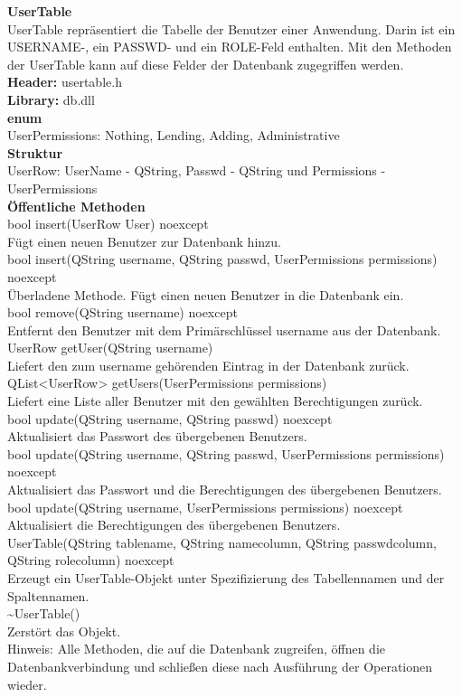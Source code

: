 \textbf{UserTable}\\
UserTable repräsentiert die Tabelle der Benutzer einer Anwendung. Darin ist ein USERNAME-, ein PASSWD- und ein ROLE-Feld enthalten. Mit den Methoden der UserTable kann auf diese Felder der Datenbank zugegriffen werden. \bigskip \\
\textbf{Header:} usertable.h\bigskip \\
\textbf{Library:} db.dll\bigskip \\
\textbf{enum}\\
UserPermissions: Nothing, Lending, Adding, Administrative\bigskip \\
\textbf{Struktur}\\
UserRow: UserName - QString, Passwd - QString und Permissions - UserPermissions\bigskip \\
\textbf{Öffentliche Methoden}\\
\small{bool insert(UserRow User) noexcept}\\
Fügt einen neuen Benutzer zur Datenbank hinzu.\bigskip \\
\small{bool insert(QString username, QString passwd, UserPermissions permissions) noexcept}\\
Überladene Methode. Fügt einen neuen Benutzer in die Datenbank ein.\bigskip \\
\small{bool remove(QString username) noexcept}\\
Entfernt den Benutzer mit dem Primärschlüssel username aus der Datenbank.\bigskip \\
\small{UserRow getUser(QString username)}\\
Liefert den zum username gehörenden Eintrag in der Datenbank zurück.\bigskip \\
\small{QList<UserRow> getUsers(UserPermissions permissions)}\\
Liefert eine Liste aller Benutzer mit den gewählten Berechtigungen zurück.\bigskip \\
\small{bool update(QString username, QString passwd) noexcept}\\
Aktualisiert das Passwort des übergebenen Benutzers.\bigskip \\
\small{bool update(QString username, QString passwd, UserPermissions permissions) noexcept}\\
Aktualisiert das Passwort und die Berechtigungen des übergebenen Benutzers.\bigskip \\
\small{bool update(QString username, UserPermissions permissions) noexcept}\\
Aktualisiert die Berechtigungen des übergebenen Benutzers.\bigskip \\
\small{UserTable(QString tablename, QString namecolumn, QString passwdcolumn, QString rolecolumn) noexcept}\\
Erzeugt ein UserTable-Objekt unter Spezifizierung des Tabellennamen und der Spaltennamen.\bigskip \\
\small{\~{}UserTable()}\\
Zerstört das Objekt.\bigskip \\
Hinweis: Alle Methoden, die auf die Datenbank zugreifen, öffnen die Datenbankverbindung und schließen diese nach Ausführung der Operationen wieder.

